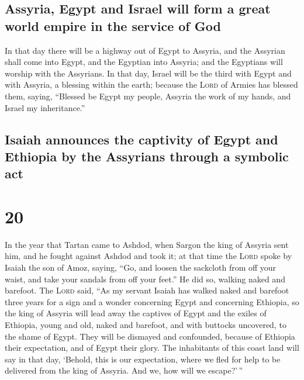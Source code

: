 \hypertarget{assyria-egypt-and-israel-will-form-a-great-world-empire-in-the-service-of-god}{%
\subsection{Assyria, Egypt and Israel will form a great world empire in
the service of
God}\label{assyria-egypt-and-israel-will-form-a-great-world-empire-in-the-service-of-god}}

 In that day there will be a highway out of Egypt to
Assyria, and the Assyrian shall come into Egypt, and the Egyptian into
Assyria; and the Egyptians will worship with the Assyrians.
 In that day, Israel will be the third with Egypt and
with Assyria, a blessing within the earth;  because the
\textsc{Lord} of Armies has blessed them, saying, ``Blessed be Egypt my
people, Assyria the work of my hands, and Israel my inheritance.''

\hypertarget{isaiah-announces-the-captivity-of-egypt-and-ethiopia-by-the-assyrians-through-a-symbolic-act}{%
\subsection{Isaiah announces the captivity of Egypt and Ethiopia by the
Assyrians through a symbolic
act}\label{isaiah-announces-the-captivity-of-egypt-and-ethiopia-by-the-assyrians-through-a-symbolic-act}}

\hypertarget{section-19}{%
\section{20}\label{section-19}}

 In the year that Tartan came to Ashdod, when Sargon the
king of Assyria sent him, and he fought against Ashdod and took it;
 at that time the \textsc{Lord} spoke by Isaiah the son of
Amoz, saying, ``Go, and loosen the sackcloth from off your waist, and
take your sandals from off your feet.'' He did so, walking naked and
barefoot.  The \textsc{Lord} said, ``As my servant Isaiah
has walked naked and barefoot three years for a sign and a wonder
concerning Egypt and concerning Ethiopia,  so the king of
Assyria will lead away the captives of Egypt and the exiles of Ethiopia,
young and old, naked and barefoot, and with buttocks uncovered, to the
shame of Egypt.  They will be dismayed and confounded,
because of Ethiopia their expectation, and of Egypt their glory.
 The inhabitants of this coast land will say in that day,
`Behold, this is our expectation, where we fled for help to be delivered
from the king of Assyria. And we, how will we escape?'\,''

